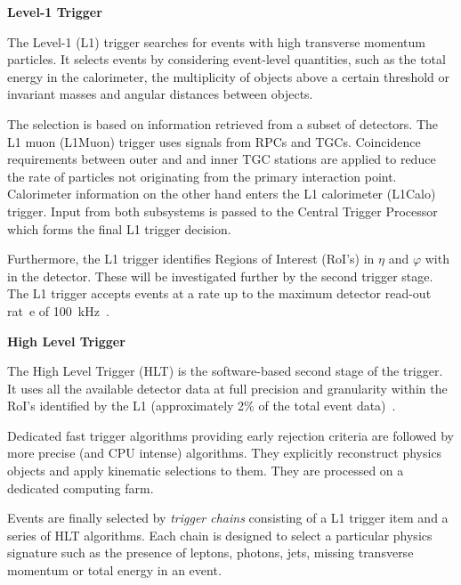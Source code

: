 \vspace{.5cm}
\noindent
\textbf{Level-1 Trigger}
\vspace{.5cm}

\noindent
The Level-1 (L1) trigger searches for events with high transverse momentum
particles. It selects events by considering event-level quantities, such as
the total energy in the calorimeter, the multiplicity of objects above
a certain threshold or invariant masses and angular distances between objects.

The selection is based on information retrieved from a subset of
detectors. The L1 muon (L1Muon) trigger uses signals from RPCs and TGCs.
Coincidence requirements between outer and and inner TGC stations are applied
to reduce the rate of particles not originating from the primary interaction
point. Calorimeter information on the other hand  enters the L1 calorimeter
(L1Calo) trigger. Input from both subsystems is passed to the Central Trigger
Processor which forms the final L1 trigger decision.

Furthermore, the L1 trigger identifies Regions of Interest (RoI's) in $\eta$
and $\varphi$ with in the detector. These will be investigated further by the
second trigger stage.
The L1 trigger accepts events at a rate up to the maximum detector read-out rat\
e of 100~kHz~\cite{TRIG-2019-04}.

\vspace{.5cm}
\noindent
\textbf{High Level Trigger}
\vspace{.5cm}

\noindent
The High Level Trigger (HLT) is the software-based second stage of the trigger.
It uses all the available detector data at full precision and granularity within the RoI's identified by the L1 (approximately 2\% of the total event data)~\cite{PERF-2007-01}.

Dedicated fast trigger algorithms providing early rejection criteria are
followed by more precise (and CPU intense) algorithms.
They explicitly reconstruct physics objects and apply kinematic selections to them.
They are processed on a dedicated computing farm.

Events are finally selected by \textit{trigger chains} consisting of a L1 trigger item and a series of HLT algorithms. Each chain
is designed to select a particular physics signature
such as the presence of leptons, photons, jets,
missing transverse momentum or total energy in an event.


